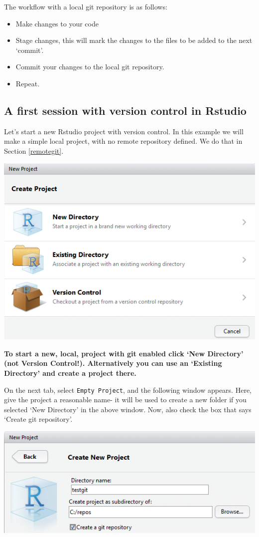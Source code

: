\documentclass[]{book}
\providecommand{\tightlist}{%
  \setlength{\itemsep}{0pt}\setlength{\parskip}{0pt}}
\begin{document}
The workflow with a local git repository is as follows:

\begin{itemize}
\tightlist
\item
  Make changes to your code
\item
  Stage changes, this will mark the changes to the files to be added to the next `commit'.
\item
  Commit your changes to the local git repository.
\item
  Repeat.
\end{itemize}

\hypertarget{firstgitsession}{%
\subsection{A first session with version control in Rstudio}\label{firstgitsession}}

Let's start a new Rstudio project with version control. In this example we will make a simple local project, with no remote repository defined. We do that in Section \ref{remotegit}.

\includegraphics[width=0.75\linewidth]{screenshots/versioncontrolproject}

\textbf{To start a new, local, project with git enabled click `New Directory' (not Version Control!). Alternatively you can use an `Existing Directory' and create a project there.}

On the next tab, select \texttt{Empty\ Project}, and the following window appears. Here, give the project a reasonable name- it will be used to create a new folder if you selected `New Directory' in the above window. Now, also check the box that says `Create git repository'.

\includegraphics[width=0.75\linewidth]{screenshots/gitnewproject}
\end{document}
